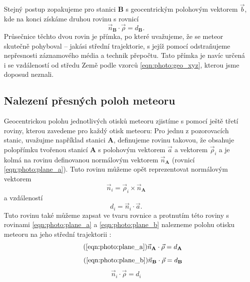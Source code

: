 \smallskip

Stejný postup zopakujeme pro stanici \textbf{B} s geocentrickým polohovým vektorem $\vec{b}$, kde na konci získáme druhou rovinu s rovnicí
\begin{equation}
    \vec{n}_\mathbf{B}\cdot \vec{\rho}=d_\mathbf{B}\text{.}
    \label{eqn:photo:plane_b}
\end{equation}
Průsečnice těchto dvou rovin je přímka, po které uvažujeme, že se meteor skutečně pohyboval -- jakási střední trajektorie, s jejíž pomocí odstraňujeme nepřesnosti záznamového média a technik přepočtu. Tato přímka je navíc určená i se vzdáleností od středu Země podle vzorců \eqref{eqn:photo:geo_xyz}, kterou jsme doposud neznali.

\subsection{Nalezení přesných poloh meteoru}
Geocentrickou polohu jednotlivých otisků meteoru zjistíme s pomocí ještě třetí roviny, kterou zavedeme pro každý otisk meteoru: Pro jednu z pozorovacích stanic, uvažujme například stanici \textbf{A}, definujeme rovinu takovou, že obsahuje polopřímku tvořenou stanicí \textbf{A} s polohovým vektorem $\vec{a}$ a vektorem $\vec{\rho}_i$ a je kolmá na rovinu definovanou normálovým vektorem $\vec{n}_\mathbf{A}$ (rovnicí \eqref{eqn:photo:plane_a}). Tuto rovinu můžeme opět reprezentovat normálovým vektorem \cite{ceplecha}
\begin{equation}
    \vec{n}_i=\vec{\rho}_i\times\vec{n}_\mathbf{A}
\end{equation}
a vzdáleností
\begin{equation}
    d_i=\vec{n}_i\cdot \vec{a}\text{.}
\end{equation}
Tuto rovinu také můžeme zapsat ve tvaru rovnice a protnutím této roviny s rovinami \eqref{eqn:photo:plane_a} a \eqref{eqn:photo:plane_b} nalezneme polohu otisku meteoru na jeho střední trajektorii \cite{ceplecha}:
\begin{equation}
    \tag{\ref{eqn:photo:plane_a}}
    \vec{n}_\mathbf{A}\cdot\vec{\rho}=d_\mathbf{A}
\end{equation}
\begin{equation}
    \tag{\ref{eqn:photo:plane_b}}
    \vec{n}_\mathbf{B}\cdot\vec{\rho}=d_\mathbf{B}
\end{equation}
\begin{equation}
    \vec{n}_i\cdot\vec{\rho}=d_i
\end{equation}

